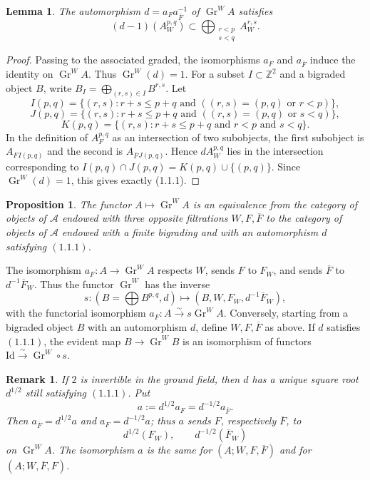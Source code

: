 \documentclass[11pt]{article}
\newtheorem{proposition}{Proposition}[section]
\newtheorem{lemma}{Lemma}[section]
\newtheorem{remark}{Remark}[section]
\newcommand{\Gr}{\operatorname{Gr}}
\begin{document}
\begin{lemma}
The automorphism \(d=a_Fa_{\overline F}^{-1}\) of \(\Gr^WA\) satisfies
\begin{equation}\tag{1.1.1}
   (d-1)(A_W^{p,q})\subset
   \bigoplus_{\substack{r<p\\ s<q}} A_W^{r,s}.
\end{equation}
\end{lemma}

\begin{proof}
Passing to the associated graded, the isomorphisms \(a_F\) and \(a_{\overline F}\) induce the identity on \(\Gr^WA\).  Thus \(\Gr^W(d)=1\).  For a subset \(I\subset \mathbb Z^2\) and a bigraded object \(B\), write \(B_I=\bigoplus_{(r,s)\in I}B^{r,s}\).  Let
\[
 I(p,q)=\{(r,s):r+s\le p+q\text{ and }((r,s)=(p,q)\text{ or }r<p)\},
\]
\[
 J(p,q)=\{(r,s):r+s\le p+q\text{ and }((r,s)=(p,q)\text{ or }s<q)\},
\]
\[
 K(p,q)=\{(r,s):r+s\le p+q\text{ and }r<p\text{ and }s<q\}.
\]
In the definition of \(A_F^{p,q}\) as an intersection of two subobjects, the first subobject is \(A_F{}_{I(p,q)}\) and the second is \(A_{\overline F}{}_{J(p,q)}\).  Hence \(dA_W^{p,q}\) lies in the intersection corresponding to \(I(p,q)\cap J(p,q)=K(p,q)\cup\{(p,q)\}\).  Since \(\Gr^W(d)=1\), this gives exactly (1.1.1).
\end{proof}

\begin{proposition}\label{prop:three-filtrations}
The functor \(A\mapsto \Gr^WA\) is an equivalence from the category of objects of \(\mathcal A\) endowed with three opposite filtrations \(W,F,\overline F\) to the category of objects of \(\mathcal A\) endowed with a finite bigrading and with an automorphism \(d\) satisfying \((1.1.1)\).
\end{proposition}

The isomorphism \(a_F:A\to\Gr^WA\) respects \(W\), sends \(F\) to \(F_W\), and sends \(\overline F\) to \(d^{-1}\overline F_W\).  Thus the functor \(\Gr^W\) has the inverse
\[
 s:(B=\bigoplus B^{p,q},d)\longmapsto (B,W,F_W,d^{-1}\overline F_W),
\]
with the functorial isomorphism \(a_F:A\xrightarrow{\sim}s\Gr^WA\).  Conversely, starting from a bigraded object \(B\) with an automorphism \(d\), define \(W,F,\overline F\) as above.  If \(d\) satisfies \((1.1.1)\), the evident map \(B\to\Gr^WB\) is an isomorphism of functors \(\mathrm{Id}\xrightarrow{\sim}\Gr^W\circ s\).

\begin{remark}\label{rem:half}
If \(2\) is invertible in the ground field, then \(d\) has a unique square root \(d^{1/2}\) still satisfying \((1.1.1)\).  Put
\[
 a:=d^{1/2}a_F=d^{-1/2}a_{\overline F}.
\]
Then \(a_{\overline F}=d^{1/2}a\) and \(a_F=d^{-1/2}a\); thus \(a\) sends \(F\), respectively \(\overline F\), to
\[
 d^{1/2}(F_W),\qquad d^{-1/2}(\overline F_W)
\]
on \(\Gr^WA\).  The isomorphism \(a\) is the same for \((A;W,F,\overline F)\) and for \((A;W,\overline F,F)\).
\end{remark}
\end{document}
